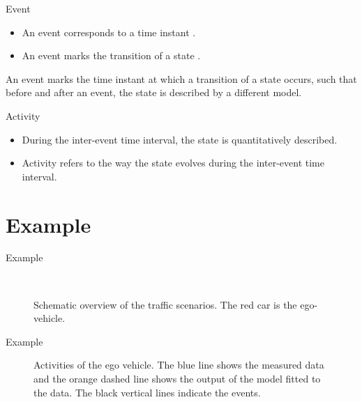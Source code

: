 \documentclass[aspectratio=\AspectR,10pt,compress,t]{beamer} %
\newlength\figurewidth
\newlength\figureheight
\begin{document}
\begin{frame}{Event}
	\begin{itemize}
		\item An event corresponds to a time instant \cite{breu1997towards, kim1993supervenience, sartori1996understanding, branicky1998hybridcontrol, boel1999hybridcontrol, heemels2012eventcontrol}.
		\item An event marks the transition of a state \cite{deGelder2017assessment}.
	\end{itemize}
	\begin{definition}[Event]
		An event marks the time instant at which a transition of a state occurs, such that before and after an event, the state is described by a different model.
	\end{definition}
\end{frame}

\begin{frame}{Activity}
	\begin{itemize}
		\item During the inter-event time interval, the state is quantitatively described.
		\item Activity refers to the way the state evolves during the inter-event time interval.
	\end{itemize}
\end{frame}

\section{Example}
\begin{frame}{Example}
	\vspace{-1em}
	\begin{figure}
		\centering
		\setlength\figureheight{106pt}
		\setlength\figurewidth{260pt}
		\\
		\setlength\figureheight{100pt}
		\caption{Schematic overview of the traffic scenarios. The red car is the ego-vehicle.}
	\end{figure}
\end{frame}

\begin{frame}{Example}
	\vspace{-1em}
	\begin{figure}
		\centering
		\setlength\figureheight{150pt}
		\setlength\figurewidth{248pt}
		
		\caption{Activities of the ego vehicle. The blue line shows the measured data and the orange dashed line shows the output of the model fitted to the data. The black vertical lines indicate the events.}
	\end{figure}
\end{frame}
\end{document}
